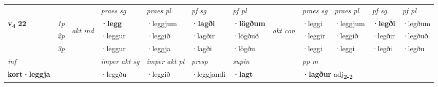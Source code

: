 \begin{longtable}[l]{X>{\footnotesize\itshape}llXXXXlXXXX}
 & &   & \textit{praes sg}  & \textit{praes pl}    & \textit{ pf sg} & \textit{pf pl} & & \textit{praes sg}  & \textit{praes pl}    & \textit{pf sg} & \textit{pf pl }  \\ \cmidrule{4-7} \cmidrule{9-12}
 \multirow{2}{*}{{{\textbf{v{\textsubscript{4}}} \Large{\textbf{22}}}}}  & 1p & \multirow{3}{*}{\begin{turn}{90}\textit{akt ind}\end{turn}} & \textbf{·legg} & ·leggjum & \textbf{·lagði} & \textbf{·lögðum} & \multirow{3}{*}{\begin{turn}{90}\textit{akt con}\end{turn}} &·leggi & ·leggjum & \textbf{·legði} & ·legðum\\*
 & 2p &  &  ·leggur  & ·leggið & ·lagðir & ·lögðuð & & ·leggir & ·leggið & ·legðir & ·legðuð \\*
 & 3p &  & ·leggur & ·leggja & ·lagði & ·lögðu & & ·leggi & ·leggi& ·legði & ·legðu \\*
\cmidrule{4-7} \cmidrule{9-12}

   {\textit{inf}} & &  & \textit{imper akt sg} & \textit{imper akt pl}   & \textit{presp} & \textit{supin}  && \textit{pp m} \\*
  {\textbf{kort\allowbreak ·leggja}} & && ·leggðu  & ·leggið   & ·leggjandi &  \textbf{·lagt}  && \multicolumn{2}{l}{\textbf{·lagður} adj\textbf{\textsubscript{2-2}}} \\*


\end{longtable}
